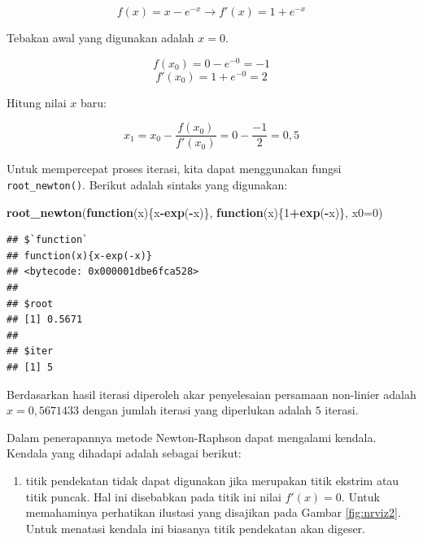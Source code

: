 \documentclass[
]{book}
\newenvironment{Shaded}{\begin{snugshade}}{\end{snugshade}}
\newcommand{\AttributeTok}[1]{\textcolor[rgb]{0.13,0.29,0.53}{#1}}
\newcommand{\ControlFlowTok}[1]{\textcolor[rgb]{0.13,0.29,0.53}{\textbf{#1}}}
\newcommand{\DecValTok}[1]{\textcolor[rgb]{0.00,0.00,0.81}{#1}}
\newcommand{\FunctionTok}[1]{\textcolor[rgb]{0.13,0.29,0.53}{\textbf{#1}}}
\newcommand{\NormalTok}[1]{#1}
\newcommand{\SpecialCharTok}[1]{\textcolor[rgb]{0.81,0.36,0.00}{\textbf{#1}}}
\providecommand{\tightlist}{%
  \setlength{\itemsep}{0pt}\setlength{\parskip}{0pt}}
\theoremstyle{definition}
\theoremstyle{definition}
\theoremstyle{definition}
\theoremstyle{definition}
\theoremstyle{remark}
\begin{document}
\[
f\left(x\right)=x-e^{-x}\to f'\left(x\right)=1+e^{-x}
\]

Tebakan awal yang digunakan adalah \(x=0\).

\[
f\left(x_0\right)=0-e^{-0}=-1
\]
\[
f'\left(x_0\right)=1+e^{-0}=2
\]

Hitung nilai \(x\) baru:

\[
x_1=x_0-\frac{f\left(x_0\right)}{f'\left(x_0\right)}=0-\frac{-1}{2}=0,5
\]

Untuk mempercepat proses iterasi, kita dapat menggunakan fungsi \texttt{root\_newton()}. Berikut adalah sintaks yang digunakan:

\begin{Shaded}
\begin{Highlighting}[]
\FunctionTok{root\_newton}\NormalTok{(}\ControlFlowTok{function}\NormalTok{(x)\{x}\SpecialCharTok{{-}}\FunctionTok{exp}\NormalTok{(}\SpecialCharTok{{-}}\NormalTok{x)\},}
            \ControlFlowTok{function}\NormalTok{(x)\{}\DecValTok{1}\SpecialCharTok{+}\FunctionTok{exp}\NormalTok{(}\SpecialCharTok{{-}}\NormalTok{x)\},}
              \AttributeTok{x0=}\DecValTok{0}\NormalTok{)}
\end{Highlighting}
\end{Shaded}

\begin{verbatim}
## $`function`
## function(x){x-exp(-x)}
## <bytecode: 0x000001dbe6fca528>
## 
## $root
## [1] 0.5671
## 
## $iter
## [1] 5
\end{verbatim}

Berdasarkan hasil iterasi diperoleh akar penyelesaian persamaan non-linier adalah \(x=0,5671433\) dengan jumlah iterasi yang diperlukan adalah \(5\) iterasi.

Dalam penerapannya metode Newton-Raphson dapat mengalami kendala. Kendala yang dihadapi adalah sebagai berikut:

\begin{enumerate}
\def\labelenumi{\arabic{enumi}.}
\tightlist
\item
  titik pendekatan tidak dapat digunakan jika merupakan titik ekstrim atau titik puncak. Hal ini disebabkan pada titik ini nilai \(f'\left(x \right)=0\). Untuk memahaminya perhatikan ilustasi yang disajikan pada Gambar \ref{fig:nrviz2}. Untuk menatasi kendala ini biasanya titik pendekatan akan digeser.
\end{enumerate}
\end{document}
